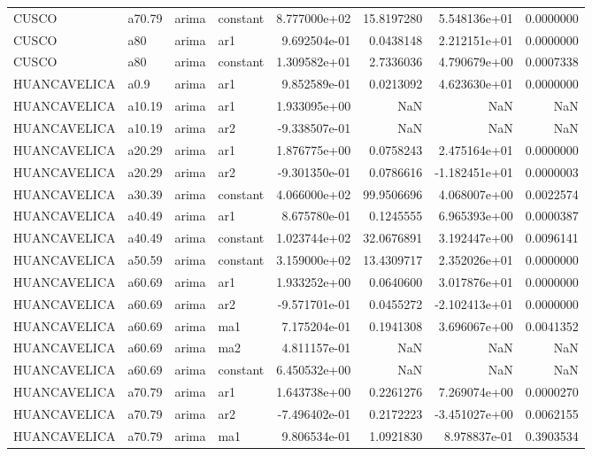 \documentclass[
]{article}
\begin{document}
\begin{table}[!h]
\begin{tabular}[t]{llllrrrr}
CUSCO & a70.79 & arima & constant & 8.777000e+02 & 15.8197280 & 5.548136e+01 & 0.0000000\\
CUSCO & a80 & arima & ar1 & 9.692504e-01 & 0.0438148 & 2.212151e+01 & 0.0000000\\
CUSCO & a80 & arima & constant & 1.309582e+01 & 2.7336036 & 4.790679e+00 & 0.0007338\\
\addlinespace
HUANCAVELICA & a0.9 & arima & ar1 & 9.852589e-01 & 0.0213092 & 4.623630e+01 & 0.0000000\\
HUANCAVELICA & a10.19 & arima & ar1 & 1.933095e+00 & NaN & NaN & NaN\\
HUANCAVELICA & a10.19 & arima & ar2 & -9.338507e-01 & NaN & NaN & NaN\\
HUANCAVELICA & a20.29 & arima & ar1 & 1.876775e+00 & 0.0758243 & 2.475164e+01 & 0.0000000\\
HUANCAVELICA & a20.29 & arima & ar2 & -9.301350e-01 & 0.0786616 & -1.182451e+01 & 0.0000003\\
\addlinespace
HUANCAVELICA & a30.39 & arima & constant & 4.066000e+02 & 99.9506696 & 4.068007e+00 & 0.0022574\\
HUANCAVELICA & a40.49 & arima & ar1 & 8.675780e-01 & 0.1245555 & 6.965393e+00 & 0.0000387\\
HUANCAVELICA & a40.49 & arima & constant & 1.023744e+02 & 32.0676891 & 3.192447e+00 & 0.0096141\\
HUANCAVELICA & a50.59 & arima & constant & 3.159000e+02 & 13.4309717 & 2.352026e+01 & 0.0000000\\
HUANCAVELICA & a60.69 & arima & ar1 & 1.933252e+00 & 0.0640600 & 3.017876e+01 & 0.0000000\\
\addlinespace
HUANCAVELICA & a60.69 & arima & ar2 & -9.571701e-01 & 0.0455272 & -2.102413e+01 & 0.0000000\\
HUANCAVELICA & a60.69 & arima & ma1 & 7.175204e-01 & 0.1941308 & 3.696067e+00 & 0.0041352\\
HUANCAVELICA & a60.69 & arima & ma2 & 4.811157e-01 & NaN & NaN & NaN\\
HUANCAVELICA & a60.69 & arima & constant & 6.450532e+00 & NaN & NaN & NaN\\
HUANCAVELICA & a70.79 & arima & ar1 & 1.643738e+00 & 0.2261276 & 7.269074e+00 & 0.0000270\\
\addlinespace
HUANCAVELICA & a70.79 & arima & ar2 & -7.496402e-01 & 0.2172223 & -3.451027e+00 & 0.0062155\\
HUANCAVELICA & a70.79 & arima & ma1 & 9.806534e-01 & 1.0921830 & 8.978837e-01 & 0.3903534\\

\end{tabular}
\end{table}
\end{document}
